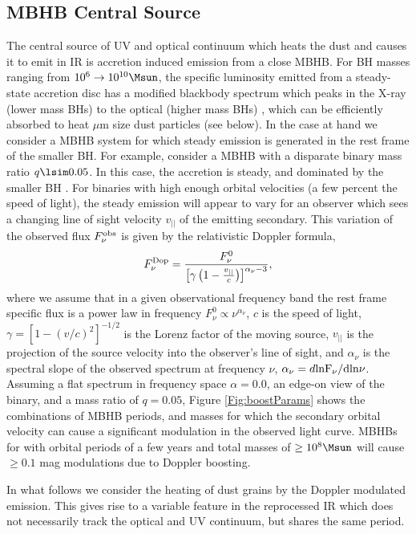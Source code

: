 \subsection{MBHB Central Source} 
The central source of UV and optical
continuum which heats the dust and causes it to emit in IR is accretion
induced emission from a close MBHB. For BH masses ranging from $10^6
\rightarrow 10^{10} \Msun$, the specific luminosity emitted from a steady-
state accretion disc has a modified blackbody spectrum which peaks in the
X-ray (lower mass BHs) to the optical (higher mass BHs) \citep{SS73,
TanakaMenou:2010}, which can be efficiently absorbed to heat $\mu$m size dust
particles (see below).  In the case at hand we consider a MBHB system for
which steady emission is generated in the rest frame of the smaller BH. For
example, consider a MBHB with a disparate binary mass ratio $q \lsim0.05$. In
this case, the accretion is steady, and dominated by the smaller BH
\citep{Farris:2014}. For binaries with high enough orbital velocities (a few
percent the speed of light), the steady emission will appear to vary for an
observer which sees a changing line of sight velocity $v_{||}$ of the emitting
secondary. This variation of the observed flux $F^{\rm{obs}}_{\nu}$ is given
by the relativistic Doppler formula,
\begin{equation}
F^{\rm{Dop}}_{\nu} = \frac{F^0_{\nu}}{\left[\gamma\left( 1 - \frac{v_{||}}{c}\right)\right]^{\alpha_{\nu} - 3}},
\label{Eq:Dop1}
\end{equation}
where we assume that in a given observational frequency band the rest frame
specific flux is a power law in frequency $F^0_{\nu} \propto
\nu^{\alpha_{\nu}}$, $c$ is the speed of light, $\gamma = \left[ 1 - (v/c)^2
\right]^{-1/2}$ is the Lorenz factor of the moving source, $v_{||}$ is the
projection of the source velocity into the observer's line of sight, and
$\alpha_{\nu}$ is the spectral slope of the observed spectrum at frequency
$\nu$, $\alpha_{\nu} = d\rm{ln}F_{\nu} / d \rm{ln}\nu$. Assuming a flat
spectrum in frequency space $\alpha=0.0$, an edge-on view of the binary, and a
mass ratio of $q=0.05$, Figure \ref{Fig:boostParams} shows the combinations of
MBHB periods, and masses for which the secondary orbital velocity can cause a
significant modulation in the observed light curve. MBHBs for with orbital
periods of a few years and total masses of $\geq 10^8 \Msun$ will cause $\geq
0.1$ mag modulations due to Doppler boosting.

In what follows we consider the heating of dust grains by the Doppler
modulated emission. This gives rise to a variable feature in the reprocessed
IR which does not necessarily track the optical and UV continuum, but shares
the same period.

